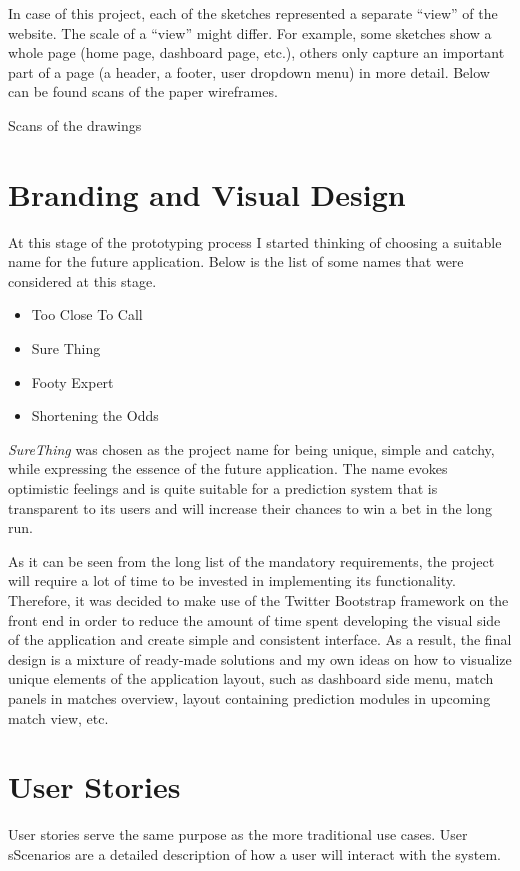 In case of this project, each of the sketches represented a separate “view” of the website. The scale of a “view” might differ. For example, some sketches show a whole page (home page, dashboard page, etc.), others only capture an important part of a page (a header, a footer, user dropdown menu) in more detail.  Below can be found scans of the paper wireframes.

Scans of the drawings

\section{Branding and Visual Design}
\label{sec:visdesign_prototype}
At this stage of the prototyping process I started thinking of choosing a suitable name for the future application. Below is the list of some names that were considered at this stage.

\begin{itemize}
	\item Too Close To Call
	\item Sure Thing
	\item Footy Expert
	\item Shortening the Odds
\end{itemize}

\emph{SureThing} was chosen as the project name for being unique, simple and catchy, while expressing the essence of the future application. The name evokes optimistic feelings and is quite suitable for a prediction system that is transparent to its users and will increase their chances to win a bet in the long run. 

As it can be seen from the long list of the mandatory requirements, the project will require a lot of time to be invested in implementing its functionality. Therefore, it was decided to make use of the Twitter Bootstrap framework on the front end \citep{documentation:Bootstrap3} \citep{web:templateProgressus} in order to reduce the amount of time spent developing the visual side of the application and create simple and consistent interface. As a result, the final design is a mixture of ready-made solutions and my own ideas on how to visualize unique elements of the application layout, such as dashboard side menu, match panels in matches overview, layout containing prediction modules in upcoming match view, etc. 

\section{User Stories}
\label{userstories_prototype}
User stories serve the same purpose as the more traditional use cases. User sScenarios are a detailed description of how a user will interact with the system. 

